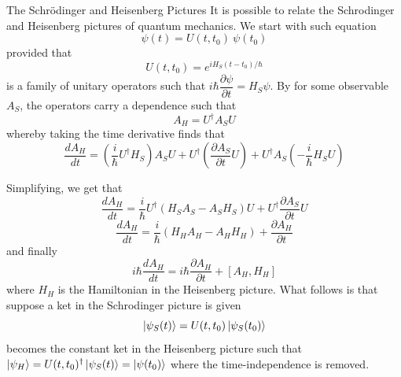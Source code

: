 \documentclass[aspectratio=169]{beamer}
\begin{document}
	\begin{frame}[allowframebreaks]{The Schrödinger and Heisenberg Pictures}
		It is possible to relate the Schrodinger and Heisenberg pictures of quantum mechanics. We start with such equation
		\begin{equation}
			\psi(t)=U(t,t_0)~\psi(t_0)
		\end{equation}
		provided that
		\begin{equation}
			U(t,t_0)=e^{iH_S(t-t_0)/\hbar}
		\end{equation}
		is a family of unitary operators such that $i\hbar\dfrac{\partial\psi}{\partial t}=H_S\psi$. By for some observable $A_S$, the operators carry a dependence such that
		\begin{equation}
			A_H=U^\dagger A_SU
		\end{equation}
		whereby taking the time derivative finds that
		\begin{equation}
			\frac{dA_H}{dt}=\left(\frac{i}{\hbar}U^\dagger H_S\right)A_SU+U^\dagger\left(\frac{\partial A_S}{\partial t}U\right)+U^\dagger A_S\left(-\frac{i}{\hbar}H_SU\right)
		\end{equation}
		
		\framebreak
		Simplifying, we get that
		\begin{equation}
			\frac{dA_H}{dt}=\frac{i}{\hbar}U^\dagger\left(H_SA_S-A_SH_S\right)U+U^\dagger\frac{\partial A_S}{\partial t}U
		\end{equation}
		\begin{equation}
			\frac{dA_H}{dt}=\frac{i}{\hbar}(H_HA_H-A_HH_H)+\frac{\partial A_H}{\partial t}
		\end{equation}
		and finally
		\begin{equation}
			i\hbar\frac{dA_H}{dt}=i\hbar\frac{\partial A_H}{\partial t}+[A_H,H_H]
		\end{equation}
		where $H_H$ is the Hamiltonian in the Heisenberg picture. What follows is that suppose a ket in the Schrodinger picture is given
		\begin{equation}
			\ket{\psi_S(t)}=U(t,t_0)\ket{\psi_S(t_0)}
		\end{equation}
		becomes the constant ket in the Heisenberg picture such that $\ket{\psi_H}=U(t,t_0)^\dagger\ket{\psi_S(t)}=\ket{\psi(t_0)}$ where the time-independence is removed. 
		

\end{frame}
\end{document}
